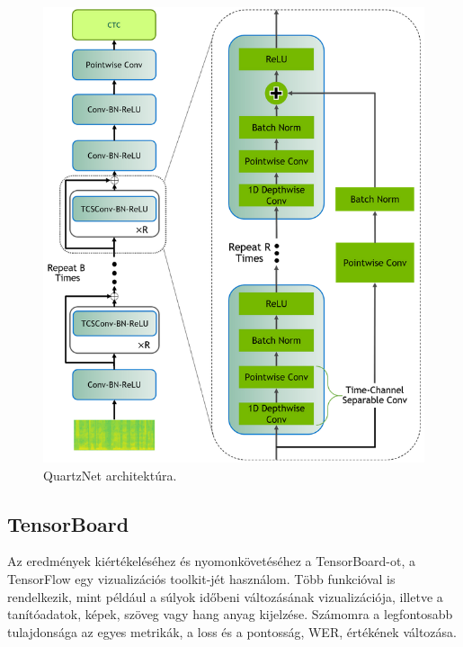 \begin{figure}[!ht]
\centering
\includegraphics[width=150mm, keepaspectratio]{figures/QuartzNet-architecture.png}
\caption{QuartzNet architektúra.}
\label{fig:TeXstudio}
\end{figure}


\subsection{TensorBoard}

Az eredmények kiértékeléséhez és nyomonkövetéséhez a TensorBoard-ot, a TensorFlow egy vizualizációs toolkit-jét használom. Több funkcióval is rendelkezik, mint például a súlyok időbeni változásának vizualizációja, illetve a tanítóadatok, képek, szöveg vagy hang anyag kijelzése. Számomra a legfontosabb tulajdonsága az egyes metrikák, a loss és a pontosság, WER, értékének változása.


